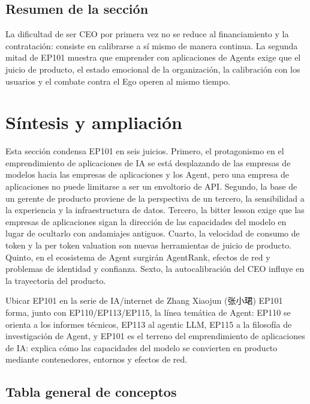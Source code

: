 \documentclass[a4paper]{article}
\begin{document}
\subsection{Resumen de la sección}

La dificultad de ser CEO por primera vez no se reduce al financiamiento y la contratación: consiste en calibrarse a sí mismo de manera continua. La segunda mitad de EP101 muestra que emprender con aplicaciones de Agents exige que el juicio de producto, el estado emocional de la organización, la calibración con los usuarios y el combate contra el Ego operen al mismo tiempo.
\section{Síntesis y ampliación}

Esta sección condensa EP101 en seis juicios. Primero, el protagonismo en el emprendimiento de aplicaciones de IA se está desplazando de las empresas de modelos hacia las empresas de aplicaciones y los Agent, pero una empresa de aplicaciones no puede limitarse a ser un envoltorio de API. Segundo, la base de un gerente de producto proviene de la perspectiva de un tercero, la sensibilidad a la experiencia y la infraestructura de datos. Tercero, la bitter lesson exige que las empresas de aplicaciones sigan la dirección de las capacidades del modelo en lugar de ocultarlo con andamiajes antiguos. Cuarto, la velocidad de consumo de token y la per token valuation son nuevas herramientas de juicio de producto. Quinto, en el ecosistema de Agent surgirán AgentRank, efectos de red y problemas de identidad y confianza. Sexto, la autocalibración del CEO influye en la trayectoria del producto.

\begin{importantbox}{Ubicar EP101 en la serie de IA/internet de Zhang Xiaojun (张小珺)}
EP101 forma, junto con EP110/EP113/EP115, la línea temática de Agent: EP110 se orienta a los informes técnicos, EP113 al agentic LLM, EP115 a la filosofía de investigación de Agent, y EP101 es el terreno del emprendimiento de aplicaciones de IA: explica cómo las capacidades del modelo se convierten en producto mediante contenedores, entornos y efectos de red.
\end{importantbox}

\subsection{Tabla general de conceptos}
\end{document}
